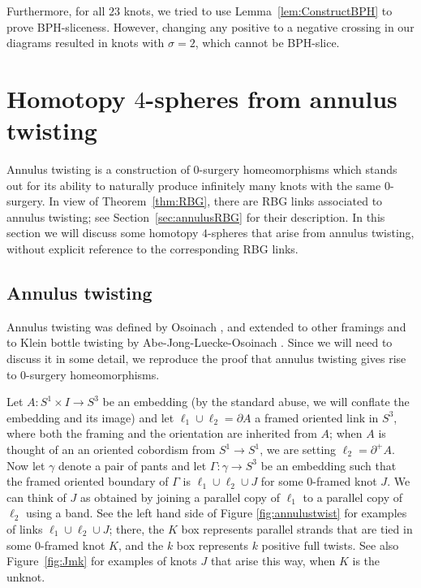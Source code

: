 \documentclass [11pt]{amsart}
\theoremstyle{remark}
\begin{document}
Furthermore, for all $23$ knots, we tried to use Lemma~\ref{lem:ConstructBPH} to prove BPH-sliceness. However, changing any positive to a negative crossing in our diagrams resulted in knots with $\sigma=2$, which cannot be BPH-slice.






\section{Homotopy $4$-spheres from annulus twisting} \label{sec:annulus}
Annulus twisting is a construction of 0-surgery homeomorphisms which stands out for its ability to naturally produce infinitely many knots with the same 0-surgery. In view of Theorem~\ref{thm:RBG}, there are RBG links associated to annulus twisting; see Section~\ref{sec:annulusRBG} for their description. In this section we will discuss some homotopy $4$-spheres  that arise from annulus twisting, without explicit reference to the corresponding RBG links.

\subsection{Annulus twisting}

Annulus twisting was defined by Osoinach \cite{Osoinach}, and extended to other framings and to Klein bottle twisting by Abe-Jong-Luecke-Osoinach \cite{AJLO}. Since we will need to discuss it in some detail, we reproduce the proof that annulus twisting gives rise to $0$-surgery homeomorphisms.

Let $A:S^1\times I\to S^3$ be an embedding (by the standard abuse, we will conflate the embedding and its image) and let $\ell_1\cup\ell_2=\partial A$ a framed oriented link in $S^3$, where both the framing and the orientation are inherited from $A$; when $A$ is thought of an an oriented cobordism from $S^1\to S^1$, we are setting $\ell_2=\partial^+A$. Now let $\gamma$ denote a pair of pants and let $\Gamma:\gamma\to S^3$ be an embedding such that the framed oriented boundary of $\Gamma$ is $\ell_1\cup\ell_2\cup J$ for some 0-framed knot $J$. We can think of $J$ as obtained by joining a parallel copy of $\ell_1$ to a parallel copy of $\ell_2$ using a band.  See the left hand side of Figure \ref{fig:annulustwist} for examples of links $\ell_1\cup\ell_2\cup J$; there, the $K$ box represents  parallel strands that are tied in some 0-framed knot $K$, and the $k$ box represents $k$ positive full twists. See also Figure~\ref{fig:Jmk} for examples of knots $J$ that arise this way, when $K$ is the unknot.
\end{document}
